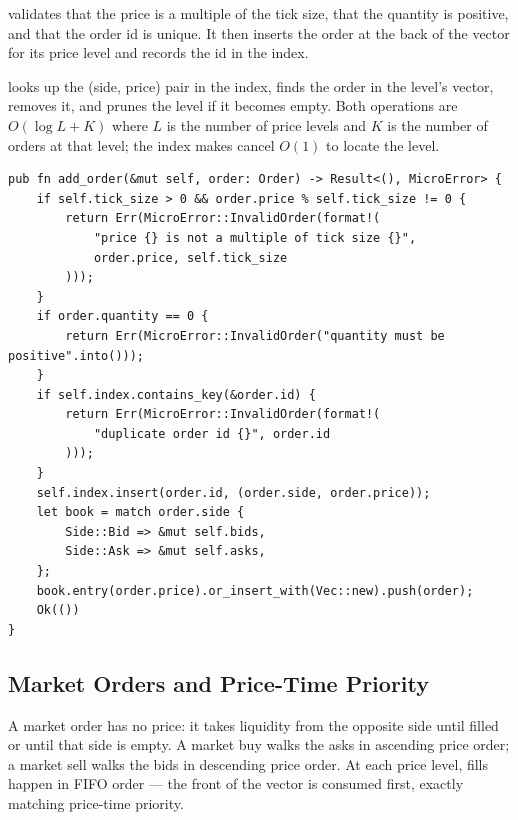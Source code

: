  validates that the price is a multiple of the tick
size, that the quantity is positive, and that the order id is unique.
It then inserts the order at the back of the vector for its price
level and records the id in the index.

 looks up the (side, price) pair in the index,
finds the order in the level's vector, removes it, and prunes the
level if it becomes empty. Both operations are $O(\log L + K)$ where
$L$ is the number of price levels and $K$ is the number of orders at
that level; the index makes cancel $O(1)$ to locate the level.

\begin{lstlisting}[caption={Adding a limit order}]
pub fn add_order(&mut self, order: Order) -> Result<(), MicroError> {
    if self.tick_size > 0 && order.price % self.tick_size != 0 {
        return Err(MicroError::InvalidOrder(format!(
            "price {} is not a multiple of tick size {}",
            order.price, self.tick_size
        )));
    }
    if order.quantity == 0 {
        return Err(MicroError::InvalidOrder("quantity must be positive".into()));
    }
    if self.index.contains_key(&order.id) {
        return Err(MicroError::InvalidOrder(format!(
            "duplicate order id {}", order.id
        )));
    }
    self.index.insert(order.id, (order.side, order.price));
    let book = match order.side {
        Side::Bid => &mut self.bids,
        Side::Ask => &mut self.asks,
    };
    book.entry(order.price).or_insert_with(Vec::new).push(order);
    Ok(())
}
\end{lstlisting}

\subsection{Market Orders and Price-Time Priority}

A market order has no price: it takes liquidity from the opposite side
until filled or until that side is empty. A market buy walks the asks
in ascending price order; a market sell walks the bids in descending
price order. At each price level, fills happen in FIFO order --- the
front of the vector is consumed first, exactly matching price-time
priority.

